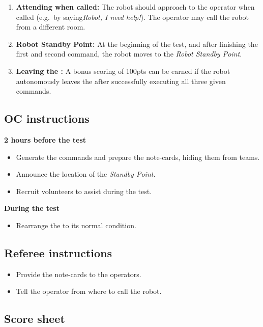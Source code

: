 \begin{enumerate}[nosep]
	\item \textbf{Attending when called:} The robot should approach to the operator when called (e.g.~by saying\textit {Robot, I need help!}). The operator may call the robot from a different room.

	\item \textbf{Robot Standby Point:} At the beginning of the test, and after finishing the first and second command, the robot moves to the \textit{Robot Standby Point}.

	\item \textbf{Leaving the \Arena{}:} A bonus scoring of 100pts can be earned if the robot autonomously leaves the \Arena{} after successfully executing all three given commands.
\end{enumerate}

\subsection*{OC instructions}

\textbf{2 hours before the test}
\begin{itemize}
	\item Generate the commands and prepare the note-cards, hiding them from teams.
	\item Announce the location of the \emph{Standby Point}.
	\item Recruit volunteers to assist during the test.
\end{itemize}

\textbf{During the test}
\begin{itemize}[nosep]
	\item Rearrange the \Arena{} to its normal condition.
\end{itemize}

\subsection*{Referee instructions}
\begin{itemize}
	\item Provide the note-cards to the operators.
	\item Tell the operator from where to call the robot.
\end{itemize}

\subsection*{Score sheet}


